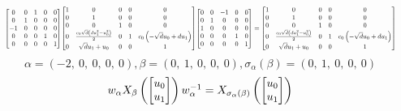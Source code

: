 \documentclass[11pt]{article}
\theoremstyle{definition}
\begin{document}
\[
\scaletoalign{\textwidth}{{\left[\begin{matrix}0 & 0 & 1 & 0 & 0\\0 & 1 & 0 & 0 & 0\\-1 & 0 & 0 & 0 & 0\\0 & 0 & 0 & 1 & 0\\0 & 0 & 0 & 0 & 1\end{matrix}\right]} {\left[\begin{matrix}1 & 0 & 0 & 0 & 0\\0 & 1 & 0 & 0 & 0\\0 & 0 & 1 & 0 & 0\\0 & \frac{c_{0} \sqrt{d} \left(d u_{1}^{2} - u_{0}^{2}\right)}{2} & 0 & 1 & c_{0} \left(- \sqrt{d} u_{0} + d u_{1}\right)\\0 & \sqrt{d} u_{1} + u_{0} & 0 & 0 & 1\end{matrix}\right]} {\left[\begin{matrix}0 & 0 & -1 & 0 & 0\\0 & 1 & 0 & 0 & 0\\1 & 0 & 0 & 0 & 0\\0 & 0 & 0 & 1 & 0\\0 & 0 & 0 & 0 & 1\end{matrix}\right]} = {\left[\begin{matrix}1 & 0 & 0 & 0 & 0\\0 & 1 & 0 & 0 & 0\\0 & 0 & 1 & 0 & 0\\0 & \frac{c_{0} \sqrt{d} \left(d u_{1}^{2} - u_{0}^{2}\right)}{2} & 0 & 1 & c_{0} \left(- \sqrt{d} u_{0} + d u_{1}\right)\\0 & \sqrt{d} u_{1} + u_{0} & 0 & 0 & 1\end{matrix}\right]}}
\]
\[
\alpha = \left( -2, \  0, \  0, \  0, \  0\right), \beta = \left( 0, \  1, \  0, \  0, \  0\right), \sigma_{\alpha}(\beta) = \left( 0, \  1, \  0, \  0, \  0\right)
\]
\[
\scaletoalign{\textwidth}{w_{\alpha} X_{\beta}\left(\left[\begin{matrix}u_{0}\\u_{1}\end{matrix}\right]\right) w_{\alpha}^{-1} = X_{\sigma_{\alpha}\left(\beta\right)}\left(\left[\begin{matrix}u_{0}\\u_{1}\end{matrix}\right]\right)}
\]
\end{document}
